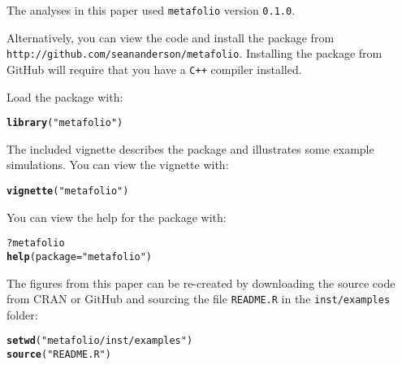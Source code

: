 \documentclass[10pt]{article}\usepackage[]{graphicx}\usepackage[]{color}
\makeatletter
\newcommand{\hlstr}[1]{\textcolor[rgb]{0.192,0.494,0.8}{#1}}%
\newcommand{\hlopt}[1]{\textcolor[rgb]{0,0,0}{#1}}%
\newcommand{\hlstd}[1]{\textcolor[rgb]{0.345,0.345,0.345}{#1}}%
\newcommand{\hlkwc}[1]{\textcolor[rgb]{0.333,0.667,0.333}{#1}}%
\newcommand{\hlkwd}[1]{\textcolor[rgb]{0.737,0.353,0.396}{\textbf{#1}}}%
\newenvironment{kframe}{%
 \def\at@end@of@kframe{}%
 \ifinner\ifhmode%
  \def\at@end@of@kframe{\end{minipage}}%
  \begin{minipage}{\columnwidth}%
 \fi\fi%
 \def\FrameCommand##1{\hskip\@totalleftmargin \hskip-\fboxsep
 \colorbox{shadecolor}{##1}\hskip-\fboxsep
     \hskip-\linewidth \hskip-\@totalleftmargin \hskip\columnwidth}%
 \MakeFramed {\advance\hsize-\width
   \@totalleftmargin\z@ \linewidth\hsize
   \@setminipage}}%
 {\par\unskip\endMakeFramed%
 \at@end@of@kframe}
\newenvironment{knitrout}{}{} %
\makeatother
\begin{document}
The analyses in this paper used \texttt{metafolio} version \texttt{0.1.0}.

Alternatively, you can view the code and install the package from\\ \texttt{http://github.com/seananderson/metafolio}. Installing the package from GitHub will require that you have a \texttt{C++} compiler installed.

\clearpage
Load the package with:

\begin{knitrout}
\color{fgcolor}\begin{kframe}
\begin{alltt}
\hlkwd{library}\hlstd{(}\hlstr{"metafolio"}\hlstd{)}
\end{alltt}
\end{kframe}
\end{knitrout}

The included vignette describes the package and illustrates some example simulations. You can view the vignette with:

\begin{knitrout}
\color{fgcolor}\begin{kframe}
\begin{alltt}
\hlkwd{vignette}\hlstd{(}\hlstr{"metafolio"}\hlstd{)}
\end{alltt}
\end{kframe}
\end{knitrout}

You can view the help for the package with:

\begin{knitrout}
\color{fgcolor}\begin{kframe}
\begin{alltt}
\hlopt{?}\hlstd{metafolio}
\hlkwd{help}\hlstd{(}\hlkwc{package} \hlstd{=} \hlstr{"metafolio"}\hlstd{)}
\end{alltt}
\end{kframe}
\end{knitrout}

The figures from this paper can be re-created by downloading the source code from CRAN or GitHub and sourcing the file \texttt{README.R} in the \texttt{inst/examples} folder:

\begin{knitrout}
\color{fgcolor}\begin{kframe}
\begin{alltt}
\hlkwd{setwd}\hlstd{(}\hlstr{"metafolio/inst/examples"}\hlstd{)}
\hlkwd{source}\hlstd{(}\hlstr{"README.R"}\hlstd{)}
\end{alltt}
\end{kframe}
\end{knitrout}
\end{document}
